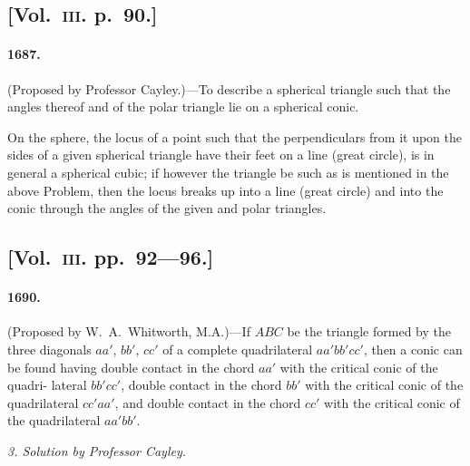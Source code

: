 \documentclass[11pt,a4paper]{article}
\begin{document}
\subsection*{[Vol.~\textsc{iii}. p.\ 90.]}

\paragraph*{1687.} (Proposed by Professor Cayley.)---To describe a spherical triangle such that
the angles thereof and of the polar triangle lie on a spherical conic.

On the sphere, the locus of a point such that the perpendiculars from it upon
the sides of a given spherical triangle have their feet on a line (great circle), is in
general a spherical cubic; if however the triangle be such as is mentioned in the
above Problem, then the locus breaks up into a line (great circle) and into the conic
through the angles of the given and polar triangles.

\subsection*{[Vol.~\textsc{iii}. pp.\ 92---96.]}

\paragraph*{1690.} (Proposed by W.~A.~Whitworth, M.A.)---If $ABC$ be the triangle formed by
the three diagonals $aa'$, $bb'$, $cc'$ of a complete quadrilateral $aa'bb'cc'$, then a conic can
be found having double contact in the chord $aa'$ with the critical conic of the quadri-
lateral $bb'cc'$, double contact in the chord $bb'$ with the critical conic of the quadrilateral
$cc'aa'$, and double contact in the chord $cc'$ with the critical conic of the quadrilateral
$aa'bb'$.

\begin{center}
\textit{3. Solution by Professor Cayley.}
\end{center}
\end{document}
